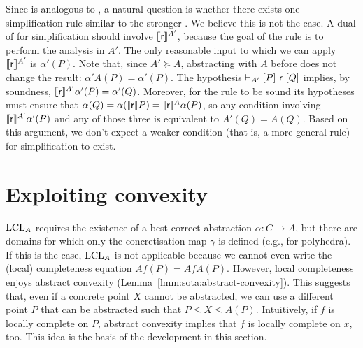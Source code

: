 Since  is analogous to , a natural question is whether there exists one simplification rule similar to the stronger . We believe this is not the case.
A dual of  for simplification should involve $\llbracket\mathsf{r}\rrbracket^{A'}$, because the goal of the rule is to perform the analysis in $A'$. The only reasonable input to which we can apply $\llbracket\mathsf{r}\rrbracket^{A'}$ is $\alpha'(P)$. Note that, since $A' \succeq A$, abstracting with $A$ before does not change the result: $\alpha' A(P) = \alpha'(P)$. The hypothesis $\vdash_{A'}\nobreak[P]~\mathsf{r}~[Q]$ implies, by soundness, $\llbracket\mathsf{r}\rrbracket^{A'} \alpha'(P) = \alpha'(Q)$. Moreover, for the rule to be sound its hypotheses must ensure that $\alpha(Q) = \alpha(\llbracket\mathsf{r}\rrbracket P) = \llbracket\mathsf{r}\rrbracket^{A} \alpha(P)$, so any condition involving $\llbracket\mathsf{r}\rrbracket^{A'} \alpha'(P)$ and any of those three is equivalent to $A'(Q) = A(Q)$.
Based on this argument, we don't expect a weaker condition (that is, a more general rule) for simplification to exist.

\section{Exploiting convexity}
$\text{LCL}_A$ requires the existence of a best correct abstraction $\alpha : C \rightarrow A$, but there are domains for which only the concretisation map $\gamma$ is defined (e.g., for polyhedra). If this is the case, $\text{LCL}_A$ is not applicable because we cannot even write the (local) completeness equation $A f(P) = A f A(P)$.
However, local completeness enjoys abstract convexity (Lemma~\ref{lmm:sota:abstract-convexity}). This suggests that, even if a concrete point $X$ cannot be abstracted, we can use a different point $P$ that can be abstracted such that $P \le X \le A(P)$. Intuitively, if $f$ is locally complete on $P$, abstract convexity implies that $f$ is locally complete on $x$, too. This idea is the basis of the development in this section.

